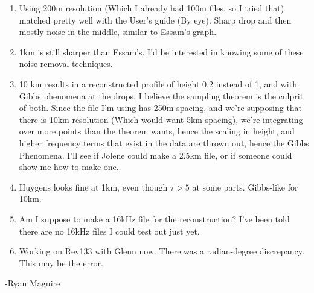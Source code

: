 \documentclass[crop=false,class=article,oneside]{standalone}
\begin{document}
\begin{enumerate}
    \item Using 200m resolution (Which I already had 100m files, so I tried that) matched pretty well with the User's guide (By eye). Sharp drop and then mostly noise in the middle, similar to Essam's graph.
    \item 1km is still sharper than Essam's. I'd be interested in knowing some of these noise removal techniques.
    \item 10 km results in a reconstructed profile of height 0.2 instead of 1, and with Gibbs phenomena at the drops. I believe the sampling theorem is the culprit of both. Since the file I'm using has 250m spacing, and we're supposing that there is 10km resolution (Which would want 5km spacing), we're integrating over more points than the theorem wants, hence the scaling in height, and higher frequency terms that exist in the data are thrown out, hence the Gibbs Phenomena. I'll see if Jolene could make a 2.5km file, or if someone could show me how to make one.
    \item Huygens looks fine at 1km, even though $\tau>5$ at some parts. Gibbs-like for 10km.
    \item Am I suppose to make a 16kHz file for the reconstruction? I've been told there are no 16kHz files I could test out just yet.
    \item Working on Rev133 with Glenn now. There was a radian-degree discrepancy. This may be the error.
\end{enumerate}
-Ryan Maguire
\end{document}
